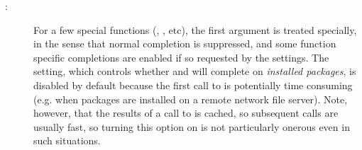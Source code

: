 \begin{Details}
\begin{description}
\item[:] 
For a few special functions (,
, etc), the first argument is treated specially,
in the sense that normal completion is suppressed, and some
function specific completions are enabled if so requested by the
settings.  The  setting, which controls whether
 and  will complete on
\emph{installed packages}, is disabled by default because the
first call to  is potentially time
consuming (e.g. when packages are installed on a remote network
file server).  Note, however, that the results of a call to
 is cached, so subsequent calls
are usually fast, so turning this option on is not particularly
onerous even in such situations.




\end{description}

\end{Details}
%
